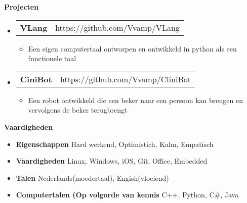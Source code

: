 \documentclass[letterpaper,12pt]{article}[leftmargin=*]
\makeatletter
\def \entryspacing {-0pt}
\renewcommand{\section}[2]{\vspace{5pt}
  \colorbox{secondary}{\color{white}\raggedbottom\normalsize\textbf{{#1}{\hspace{7pt}#2}}}
}
\newcommand{\resumeEntryStart}{\begin{itemize}[leftmargin=2.5mm]}
\newcommand{\resumeEntryEnd}{\end{itemize}\vspace{\entryspacing}}
\newcommand{\resumeItemListStart}{\begin{itemize}[leftmargin=4.5mm]}
\newcommand{\resumeItemListEnd}{\end{itemize}}
\newcommand{\resumeItem}[1]{
  \item\small{
    {#1 \vspace{-2pt}}
  }
}
\newcommand{\resumeEntryTD}[2]{
  \vspace{-1pt}\item[]
    \begin{tabularx}{0.97\textwidth}{X@{\hspace{60pt}}r}
      \textbf{\color{primary}#1} & {\firabook\color{accent}\small#2} \\
    \end{tabularx}\vspace{-6pt}
}
\newcommand{\resumeEntryS}[2]{
  \item[]\small{
    \textbf{\color{primary}#1 }{ #2 \vspace{-6pt}}
  }
}
\makeatother
\begin{document}
  


\section{\faFlask}{Projecten}

  \resumeEntryStart
    \resumeEntryTD
      {VLang}{https://github.com/Vvamp/VLang}
    \resumeItemListStart
      \resumeItem {Een eigen computertaal ontworpen en ontwikkeld in python als een functionele taal}
    \resumeItemListEnd
  \resumeEntryEnd

  \resumeEntryStart
    \resumeEntryTD
      {CiniBot}{https://github.com/Vvamp/CliniBot}
    \resumeItemListStart
      \resumeItem {Een robot ontwikkeld die een beker naar een persoon kan brengen en vervolgens de beker terugbrengt}
    \resumeItemListEnd
  \resumeEntryEnd
  

 

\section{\faGears}{Vaardigheden}
 \resumeEntryStart
  \resumeEntryS{Eigenschappen } {Hard werkend, Optimistich, Kalm, Empatisch}
  \resumeEntryS{Vaardigheden } {Linux, Windows, iOS, Git, Office, Embedded}
  \resumeEntryS{Talen } {Nederlands(moedertaal), Engish(vloeiend)}
  \resumeEntryS{Computertalen (Op volgorde van kennis} {C++, Python, C\#, Java}

 \resumeEntryEnd
\end{document}
